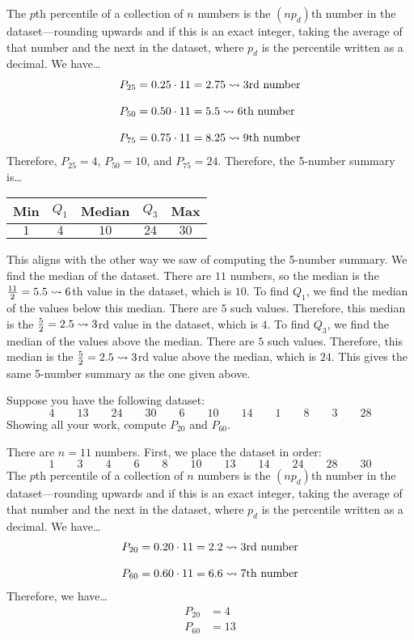 \documentclass[12pt,letterpaper]{exam}
\begin{document}
\begin{questions}
The $p$th percentile of a collection of $n$ numbers is the $(np_d)$th number in the dataset---rounding upwards and if this is an exact integer, taking the average of that number and the next in the dataset, where $p_d$ is the percentile written as a decimal. We have\dots
	\[
	\begin{aligned}
	P_{25}&= 0.25 \cdot 11= 2.75 \rightsquigarrow 3\text{rd number} \\[0.3cm]
	P_{50}&= 0.50 \cdot 11= 5.5 \rightsquigarrow 6\text{th number} \\[0.3cm]
	P_{75}&= 0.75 \cdot 11= 8.25 \rightsquigarrow 9\text{th number}
	\end{aligned}
	\] 
Therefore, $P_{25}= 4$, $P_{50}= 10$, and $P_{75}= 24$. Therefore, the 5-number summary is\dots \par
	\begin{table}[ht]
	\centering
	\begin{tabular}{ccccc}
	Min & $Q_1$ & Median & $Q_3$ & Max \\ \hline
	$1$ & $4$ & $10$ & $24$ & $30$
	\end{tabular}
	\end{table} \pspace

This aligns with the other way we saw of computing the 5-number summary. We find the median of the dataset. There are $11$ numbers, so the median is the $\frac{11}{2}= 5.5 \rightsquigarrow 6$th value in the dataset, which is $10$. To find $Q_1$, we find the median of the values below this median. There are $5$ such values. Therefore, this median is the $\frac{5}{2}= 2.5 \rightsquigarrow 3$rd value in the dataset, which is $4$. To find $Q_3$, we find the median of the values above the median. There are $5$ such values. Therefore, this median is the $\frac{5}{2}= 2.5 \rightsquigarrow 3$rd value above the median, which is $24$. This gives the same 5-number summary as the one given above. 



\newpage
\question[10] Suppose you have the following dataset:
	\[
	4 \qquad 13 \qquad 24 \qquad 30 \qquad 6 \qquad 10 \qquad 14 \qquad 1 \qquad 8 \qquad 3 \qquad 28
	\]
Showing all your work, compute $P_{20}$ and $P_{60}$. \pspace

\sol There are $n= 11$ numbers. First, we place the dataset in order:
	\[
	1 \qquad 3 \qquad 4 \qquad 6 \qquad 8 \qquad 10 \qquad 13 \qquad 14 \qquad 24 \qquad 28 \qquad 30
	\]
The $p$th percentile of a collection of $n$ numbers is the $(np_d)$th number in the dataset---rounding upwards and if this is an exact integer, taking the average of that number and the next in the dataset, where $p_d$ is the percentile written as a decimal. We have\dots
	\[
	\begin{aligned}
	P_{20}&= 0.20 \cdot 11= 2.2 \rightsquigarrow 3\text{rd number} \\[0.3cm]
	P_{60}&= 0.60 \cdot 11= 6.6 \rightsquigarrow 7\text{th number}
	\end{aligned}
	\] 
Therefore, we have\dots
	\[
	\begin{aligned}
	P_{20}&= 4 \\[0.3cm]
	P_{60}&= 13
	\end{aligned}
	\]




\end{questions}
\end{document}
